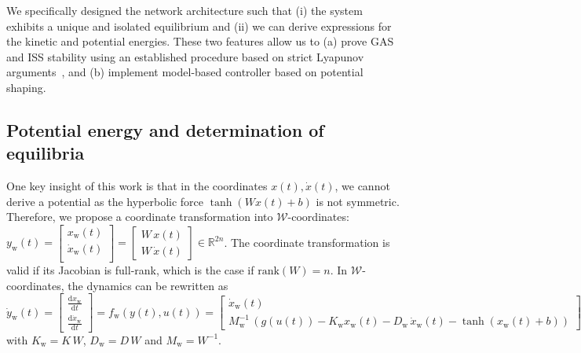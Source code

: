 We specifically designed the network architecture such that (i) the system exhibits a unique and isolated equilibrium and (ii) we can derive expressions for the kinetic and potential energies. These two features allow us to (a) prove \gls{GAS} and \gls{ISS} stability using an established procedure based on strict Lyapunov arguments~\citep{calzolari2020exponential, wu2022passive}, and (b) implement model-based controller based on potential shaping.

\subsection{Potential energy and determination of equilibria}

One key insight of this work is that in the coordinates $x(t), \dot{x}(t)$, we cannot derive a potential 
as the hyperbolic force $\tanh(W x(t) + b)$ is not symmetric. Therefore, we propose a coordinate transformation into $\mathcal{W}$-coordinates: $y_\mathrm{w}(t) = \begin{bmatrix}
    x_\mathrm{w}(t)\\
    \dot{x}_\mathrm{w}(t)\\
\end{bmatrix} = \begin{bmatrix}
    W \, x(t)\\
    W \, \dot{x}(t)
\end{bmatrix} \in \mathbb{R}^{2n}$. The coordinate transformation is valid if its Jacobian is full-rank, which is the case if $\mathrm{rank}(W) = n$.
In $\mathcal{W}$-coordinates, the dynamics can be rewritten as
\begin{equation}\label{eq:con:conw_dynamics}
    \dot{y}_\mathrm{w}(t) = \begin{bmatrix}
        \frac{\mathrm{d}x_\mathrm{w}}{\mathrm{d}t}\\
        \frac{\mathrm{d}\dot{x}_\mathrm{w}}{\mathrm{d}t}
    \end{bmatrix} = f_\mathrm{w}(y(t), u(t)) = \begin{bmatrix}
        \dot{x}_\mathrm{w}(t)\\
        M_\mathrm{w}^{-1} \, \left (g(u(t)) -K_\mathrm{w} x_\mathrm{w}(t) - D_\mathrm{w} \, \dot{x}_\mathrm{w}(t) - \tanh(x_\mathrm{w}(t) + b) \right )
    \end{bmatrix}
\end{equation}
with $K_\mathrm{w} = K \, W$, $D_\mathrm{w} = D \, W$ and $M_\mathrm{w} = W^{-1}$. 

